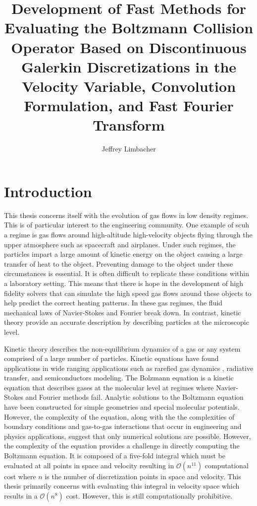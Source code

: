 \documentclass[12pt]{CSUNthesis}
\author{Jeffrey Limbacher}
\title{Development of Fast Methods for Evaluating the Boltzmann Collision Operator Based on Discontinuous Galerkin Discretizations in the Velocity Variable, Convolution Formulation, and Fast Fourier Transform}
\begin{document}
\doublespacing


\chapter{Introduction}
\label{Chap1}
This thesis concerns itself with the evolution of gas flows in low density regimes. This is of particular interest to the engineering community. One example of scuh a regime is gas flows around high-altitude high-velocity objects flying through the upper atmosphere such as spacecraft and airplanes. Under such regimes, the particles impart a large amount of kinetic energy on the object causing a large transfer of heat to the object. Preventing damage to the object under these circumstances is essential. It is often difficult to replicate these conditions within a laboratory setting. This means that there is hope in the development of high fidelity solvers that can simulate the high speed gas flows around these objects to help predict the correct heating patterns. In these gas regimes, the fluid mechanical laws of Navier-Stokes and Fourier break down. In contrast, kinetic theory provide an accurate description by describing particles at the microscopic level.

Kinetic theory describes the non-equilibrium dynamics of a gas or any system comprised of a large number of particles. Kinetic equations have found applications in wide ranging applications such as rarefied gas dynamics \cite{Kremer2010} \cite{Kogan1969}, radiative transfer, and semiconductors modeling. 
The Bolzmann equation is a kinetic equation that describes gases at the molecular level at regimes where Navier-Stokes and Fourier methods fail. Analytic solutions to the Boltzmann equation have been constructed for simple geometries and special molecular potentials. However, the complexity of the equation, along with the the complexities of boundary conditions and gas-to-gas interactions that occur in engineering and physics applications, suggest that only numerical solutions are possible. However, the complexity of the equation provides a challenge in directly computing the Boltzmann equation. It is composed of a five-fold integral which must be evaluated at all points in space and velocity resulting in $\mathcal{O}(n^{11})$ computational cost where $n$ is the number of discretization points in space and velocity. This thesis primarily concerns with evaluating this integral in velocity space which results in a $\mathcal{O}(n^8)$ cost. However, this is still computationally prohibitive.
\end{document}

